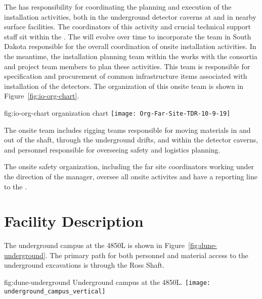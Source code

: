 The  has
responsibility for coordinating the planning and execution of 
the  installation activities, both 
in the underground detector caverns at  and in 
nearby surface facilities. The coordinators of this activity and crucial technical support
staff sit within the .
The   will evolve over 
time to incorporate the team in South Dakota responsible for the 
overall coordination of onsite installation activities.  In the 
meantime, the installation planning team within the  works with 
the  consortia and  project team members 
to plan these activities.  This team is responsible for specification 
and procurement of common infrastructure items associated with 
installation of the detectors. The organization of this onsite team is 
shown in Figure~\ref{fig:io-org-chart}.

\begin{dunefigure}{fig:io-org-chart}
  {  organization chart}
  \texttt{[image: Org-Far-Site-TDR-10-9-19]}
\end{dunefigure}

The onsite  team includes rigging teams responsible for moving 
materials in and out of the shaft, through the underground drifts, 
and within the detector caverns, and personnel responsible 
for overseeing safety and logistics planning.  

The onsite safety organization, including the far site  coordinators
working under the direction of the  
manager, oversee all onsite activites and have a %
reporting line to the .

\section{Facility Description}
\label{sec:es-tc-facility}

The  underground campus at the  4850L is shown in
Figure~\ref{fig:dune-underground}. The primary path for both personnel 
and material access to the underground excavations is through the Ross Shaft.
\begin{dunefigure}{fig:dune-underground}
  {Underground campus at the 4850L.}
  \texttt{[image: underground\_campus\_vertical]}
\end{dunefigure}

